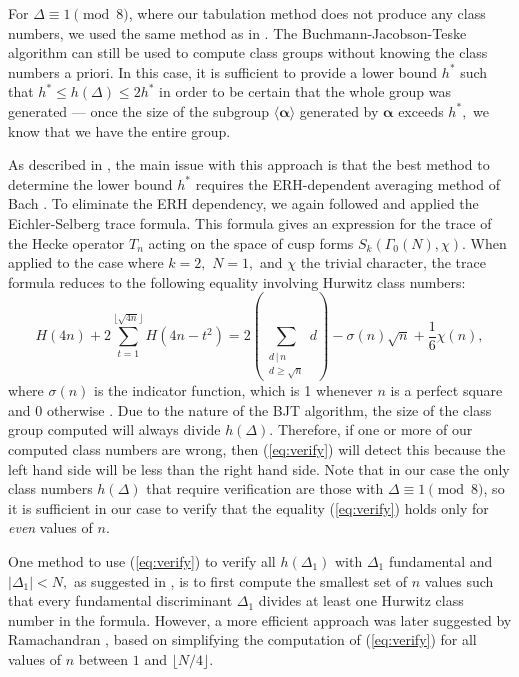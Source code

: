 \documentclass{mcom-l}
\theoremstyle{definition}
\begin{document}
For $\Delta \equiv 1 \pmod{8}$, where our tabulation method does not
produce any class numbers, we used the same method as in
\cite{jacobson}.  The Buchmann-Jacobson-Teske algorithm can still be
used to compute class groups without knowing the class numbers a
priori.  In this case, it is sufficient to provide a lower bound $h^*$
such that $h^* \leq h(\Delta) \leq 2h^*$ in order to be certain that
the whole group was generated --- once the size of the subgroup
$\langle \bm{\alpha} \rangle$ generated by $\bm{\alpha}$ exceeds
$h^*,$ we know that we have the entire group.

As described in \cite{jacobson}, the main issue with this approach is
that the best method to determine the lower bound $h^*$ requires the
ERH-dependent averaging method of Bach \cite{bach1}.  To eliminate the
ERH dependency, we again followed \cite{jacobson} and applied the
Eichler-Selberg trace formula. This formula gives an expression for
the trace of the Hecke operator $T_n$ acting on the space of cusp
forms $S_k(\Gamma_0(N),\chi).$ When applied to the case where $k=2,$
$N=1,$ and $\chi$ the trivial character, the trace formula reduces to
the following equality involving Hurwitz class numbers:
\begin{equation} \label{eq:verify}
H(4n) + 2\sum_{t = 1}^{\lfloor \sqrt{4n} \rfloor}H(4n-t^2) = 2\left(\sum_{\substack{d\,|\,n\\d \geq \sqrt n}} d\right) - \sigma(n)\sqrt n + \frac{1}{6}\chi(n),
\end{equation}
where $\sigma(n)$ is the indicator function, which is 1 whenever $n$
is a perfect square and 0 otherwise \cite[Formula 2.2]{jacobson}. Due to the
nature of the BJT algorithm, the size of the class group computed will
always divide $h(\Delta)$. Therefore, if one or more of our computed
class numbers are wrong, then (\ref{eq:verify}) will detect this
because the left hand side will be less than the right hand side.
Note that in our case the only class numbers $h(\Delta)$ that require
verification are those with $\Delta \equiv 1 \pmod{8}$, so it is
sufficient in our case to verify that the equality (\ref{eq:verify})
holds only for \emph{even} values of $n$.

One method to use (\ref{eq:verify}) to verify all $h(\Delta_1)$ with
$\Delta_1$ fundamental and $|\Delta_1| < N,$ as suggested in
\cite{jacobson}, is to first compute the smallest set of $n$ values
such that every fundamental discriminant $\Delta_1$ divides at least
one Hurwitz class number in the formula.  However, a more efficient
approach was later suggested by Ramachandran \cite{ramachandran},
based on simplifying the computation of (\ref{eq:verify}) for all
values of $n$ between $1$ and $\lfloor N / 4 \rfloor.$ 
\end{document}
